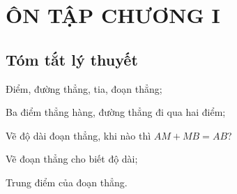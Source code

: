 \section{ÔN TẬP CHƯƠNG I}
\subsection{Tóm tắt lý thuyết}
\begin{enumEX}[1)]{1}
\item Điểm, đường thẳng, tia, đoạn thẳng;
\item Ba điểm thẳng hàng, đường thẳng đi qua hai điểm;
\item Vẽ độ dài đoạn thẳng, khi nào thì $AM+MB=AB$?
\item Vẽ đoạn thẳng cho biết độ dài;
\item Trung điểm của đoạn thẳng.
\end{enumEX}
